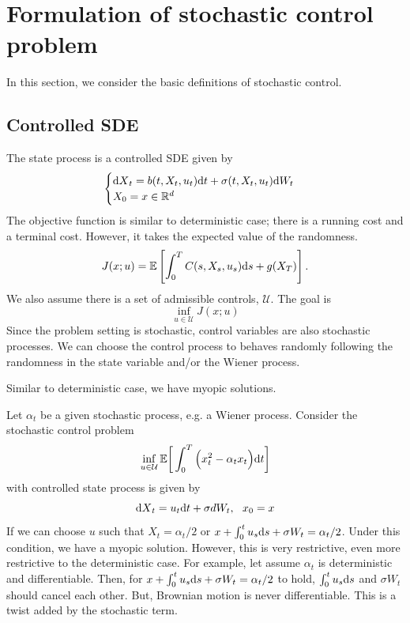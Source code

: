 \documentclass[11pt]{book}
\newcommand{\dt}{\text{\normalfont d}t}
\newcommand{\ds}{\text{\normalfont d}s}
\newcommand{\dX}{\text{\normalfont d}X}
\newcommand{\dW}{\text{\normalfont d}W}
\begin{document}
\section{Formulation of stochastic control problem}
In this section, we consider the basic definitions of  stochastic control.
\subsection{Controlled SDE}
The state process is a controlled SDE given by
\begin{equation}\label{eqn:state_process}
	\begin{cases}
	    {\dX}_t =b(t,X_t,u_t){\dt}+\sigma(t,X_t,u_t)\dW_t\\
     X_0=x\in\mathbb{R}^d
	\end{cases}
\end{equation}
The objective function is similar to deterministic case; there is a running cost and a terminal cost. However, it takes the expected value of the randomness.
\begin{equation}
J(x;u)=\mathbb{E}\left[\int_0^T C(s,X_s,u_s){{\ds}}+g(X_T)\right].
\end{equation}
We also assume there is a set of admissible controls, $\mathcal{U}$. The goal is
\[
\inf_{u\in\mathcal{U}}J(x;u)
\]
Since the problem setting is stochastic, control variables are also stochastic processes. We can choose the control process to behaves randomly following the randomness in the state variable and/or the Wiener process.

Similar to deterministic case, we have myopic solutions. 
\begin{eg}
Let $\alpha_t$ be a given stochastic process, e.g. a Wiener process. Consider the stochastic control problem
    \begin{equation}\label{simple_stoch_control}
        \inf_{u\in\mathcal{U}}\mathbb{E}\bigg[\int_0^T\Big(x_t^2 - \alpha_t x_t\Big) {\dt}\bigg]
    \end{equation}
with controlled state process is given by
\begin{equation}\label{dynamic_SDE_x}
    {\dX}_t =  u_t {\dt}+\sigma dW_t, ~~ x_0=x
\end{equation}
If we can choose $u$ such that $X_t=\alpha_t/2$ or $x+\int_0^tu_s\ds+\sigma W_t=\alpha_t/2$. Under this condition, we have a myopic solution. However, this is very restrictive, even more restrictive to the deterministic case. For example, let assume $\alpha_t$ is deterministic and differentiable. Then, for $x+\int_0^tu_s\ds+\sigma W_t=\alpha_t/2$ to hold, $\int_0^tu_s\ds$ and $\sigma W_t$ should cancel each other. But, Brownian motion is never differentiable. This is a twist added by the stochastic term.
\end{eg}
\end{document}
